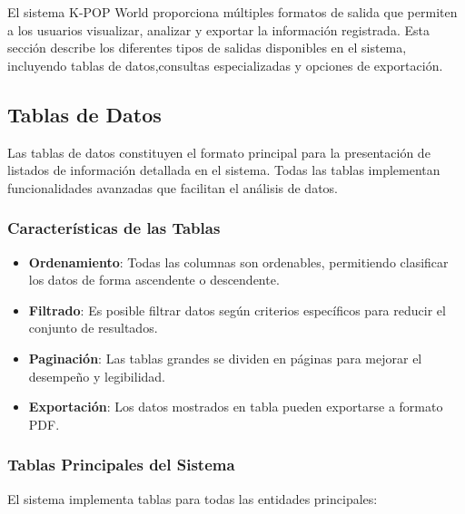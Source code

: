 \documentclass[12pt,a4paper,spanish,oneside]{article}
\begin{document}
	El sistema K-POP World proporciona múltiples formatos de salida que permiten a los usuarios visualizar, analizar y exportar la información registrada. Esta sección describe los diferentes tipos de salidas disponibles en el sistema, incluyendo tablas de datos,consultas especializadas y opciones de exportación.
	
	\subsection{Tablas de Datos}
	
	Las tablas de datos constituyen el formato principal para la presentación de listados de información detallada en el sistema. Todas las tablas implementan funcionalidades avanzadas que facilitan el análisis de datos.
	
	\subsubsection{Características de las Tablas}
	
	\begin{itemize}
		\item \textbf{Ordenamiento}: Todas las columnas son ordenables, permitiendo clasificar los datos de forma ascendente o descendente.
		\item \textbf{Filtrado}: Es posible filtrar datos según criterios específicos para reducir el conjunto de resultados.
		\item \textbf{Paginación}: Las tablas grandes se dividen en páginas para mejorar el desempeño y legibilidad.
		\item \textbf{Exportación}: Los datos mostrados en tabla pueden exportarse a formato PDF.
	\end{itemize}
	
	\subsubsection{Tablas Principales del Sistema}
	
	El sistema implementa tablas para todas las entidades principales:
	
\end{document}
